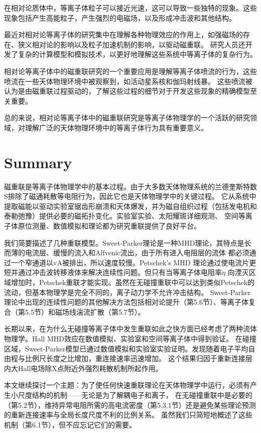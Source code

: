 \documentclass[12pt, a4paper, oneside]{article}
\begin{document}
\begin{spacing}{2.0}
在相对论质体中，等离子体粒子可以接近光速，这可以导致一些独特的现象。这些现象包括产生高能粒子，产生强烈的电磁场，以及形成冲击波和其他结构。

最近对相对论等离子体的研究集中在理解各种物理效应的作用上，如强磁场的存在、狭义相对论的影响以及粒子加速机制的影响，以驱动磁重联。
研究人员还开发了复杂的计算模型和模拟技术，以更好地理解这些系统中等离子体的复杂行为。

相对论等离子体中的磁重联研究的一个重要应用是理解等离子体喷流的行为，这些喷流在一些天体物理环境中被观察到，如活动星系核和伽玛射线暴。
这些喷流被认为是由磁重联过程驱动的，了解这些过程的细节对于开发这些现象的精确模型至关重要。

总的来说，相对论等离子体中的磁重联研究是等离子体物理学的一个活跃的研究领域，对理解广泛的天体物理环境中的等离子体行为具有重要意义。






\section{Summary}
磁重联是等离子体物理学中的基本过程。由于大多数天体物理系统的兰德奎斯特数S排除了磁通耗散等电阻行为，因此它也是天体物理学中的关键过程。
它从系统中提取磁能以驱动实验室锯齿形崩溃和天体爆发，并为磁自组织过程（包括发电机和泰勒弛豫）提供必要的磁拓扑变化。实验室实验、太阳耀斑详细观测、
空间等离子体原位测量、数值模拟和理论都为研究重联提供了良好平台。

我们简要描述了几种重联模型。Sweet-Parker理论是一种MHD理论，其特点是长而薄的电流层、缓慢的流入和Alfvenic流出，由于所有进入电阻层的流体
都必须通过一个窄通道以vA被排出，所以速度较慢。Petschek's MHD 理论通过使电流片更短并通过冲击波转移液体来解决连续性问题。但只有当等离子体电阻率$\eta$
向湮灭区域增加时，Petschek重联才能实现。虽然在无碰撞重联中可以达到类似Petschek的流动，但基本物理学是完全不同的，离子动力学不允许冲击结构。
Sweet-Parker理论中出现的连续性问题的其他解决方法包括相对论提升（第5.6节）、等离子体复合（第5.5节）和磁场线湍流扩散（第5.7节）。

长期以来，在为什么无碰撞等离子体中发生重联如此之快方面已经考虑了两种流体物理学。Hall MHD效应在数值模拟、实验室和空间等离子体中得到验证。
在碰撞区域，Sweet-Parker模型已通过数值模拟和实验室实验证明。发现随着电子平均自由程与比例尺长度之比增加，重连接速率迅速增加。
这个结果归因于重新连接层内大Hall电场除X点附近外强烈耗散机制所起作用。

本文继续探讨一个主题：为了使任何快速重联理论在天体物理学中运行，必须有产生小尺度结构的机制——无论是为了解耦电子和离子，
在无碰撞重联中是必要的（第5.2节），维持异常电阻所需的高电流密度（第5.3.1节）还是避免某些理论预测的重新连接速率与全局长度尺度不利的比例关系。
虽然我们只简短地概述了这些机制（第6.1节），但不应忘记它们的需要。


\end{spacing}
\end{document}
